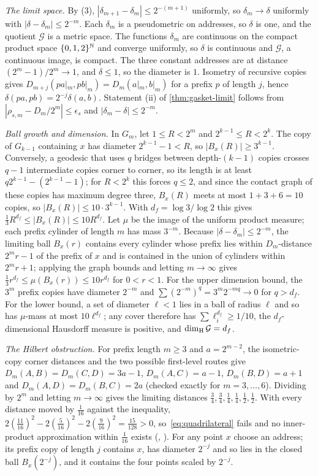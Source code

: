 \emph{The limit space.}
By (3), $|\delta_{m+1}-\delta_m|\le2^{-(m+1)}$ uniformly, so $\delta_m\to\delta$ uniformly with $|\delta-\delta_m|\le2^{-m}$.
Each $\delta_m$ is a pseudometric on addresses, so $\delta$ is one, and the quotient $\mathcal G$ is a metric space.
The functions $\delta_m$ are continuous on the compact product space $\{0,1,2\}^{\mathbb{N}}$ and converge uniformly, so $\delta$ is continuous and $\mathcal G$, a continuous image, is compact.
The three constant addresses are at distance $(2^m-1)/2^m\to1$, and $\delta\le1$, so the diameter is $1$.
Isometry of recursive copies gives $D_{m+j}(pa|_m,pb|_m)=D_m(a|_m,b|_m)$ for a prefix $p$ of length $j$, hence $\delta(pa,pb)=2^{-j}\delta(a,b)$.
Statement (ii) of \cref{thm:gasket-limit} follows from $|\rho_{s,m}-D_m/2^m|\le\epsilon_s$ and $|\delta_m-\delta|\le2^{-m}$.

\emph{Ball growth and dimension.}
In $G_m$, let $1\le R<2^m$ and $2^{k-1}\le R<2^k$.
The copy of $G_{k-1}$ containing $x$ has diameter $2^{k-1}-1<R$, so $|B_x(R)|\ge3^{k-1}$.
Conversely, a geodesic that uses $q$ bridges between depth-$(k-1)$ copies crosses $q-1$ intermediate copies corner to corner, so its length is at least $q2^{k-1}-(2^{k-1}-1)$; for $R<2^k$ this forces $q\le2$, and since the contact graph of these copies has maximum degree three, $B_x(R)$ meets at most $1+3+6=10$ copies, so $|B_x(R)|\le10\cdot3^{k-1}$.
With $d_f=\log3/\log2$ this gives $\tfrac13R^{d_f}\le|B_x(R)|\le10R^{d_f}$.
Let $\mu$ be the image of the uniform product measure; each prefix cylinder of length $m$ has mass $3^{-m}$.
Because $|\delta-\delta_m|\le2^{-m}$, the limiting ball $B_x(r)$ contains every cylinder whose prefix lies within $D_m$-distance $2^m r-1$ of the prefix of $x$ and is contained in the union of cylinders within $2^m r+1$; applying the graph bounds and letting $m\to\infty$ gives $\tfrac13r^{d_f}\le\mu(B_x(r))\le10r^{d_f}$ for $0<r<1$.
For the upper dimension bound, the $3^m$ prefix copies have diameter $2^{-m}$ and $\sum(2^{-m})^q=3^m2^{-mq}\to0$ for $q>d_f$.
For the lower bound, a set of diameter $\ell<1$ lies in a ball of radius $\ell$ and so has $\mu$-mass at most $10\ell^{d_f}$; any cover therefore has $\sum\ell_i^{d_f}\ge1/10$, the $d_f$-dimensional Hausdorff measure is positive, and $\dim_{\mathrm{H}}\mathcal G=d_f$.

\emph{The Hilbert obstruction.}
For prefix length $m\ge3$ and $a=2^{m-2}$, the isometric-copy corner distances and the two possible first-level routes give
$D_m(A,B)=D_m(C,D)=3a-1$, $D_m(A,C)=a-1$, $D_m(B,D)=a+1$ and $D_m(A,D)=D_m(B,C)=2a$ (checked exactly for $m=3,\dots,6$).
Dividing by $2^m$ and letting $m\to\infty$ gives the limiting distances $\tfrac34,\tfrac34,\tfrac14,\tfrac14,\tfrac12,\tfrac12$.
With every distance moved by $\tfrac1{16}$ against the inequality, $2(\tfrac{11}{16})^2-2(\tfrac5{16})^2-2(\tfrac9{16})^2=\tfrac{15}{128}>0$, so~\eqref{eq:quadrilateral} fails and no inner-product approximation within $\tfrac1{16}$ exists (, ).
For any point $x$ choose an address; its prefix copy of length $j$ contains $x$, has diameter $2^{-j}$ and so lies in the closed ball $B_x(2^{-j})$, and it contains the four points scaled by $2^{-j}$.

